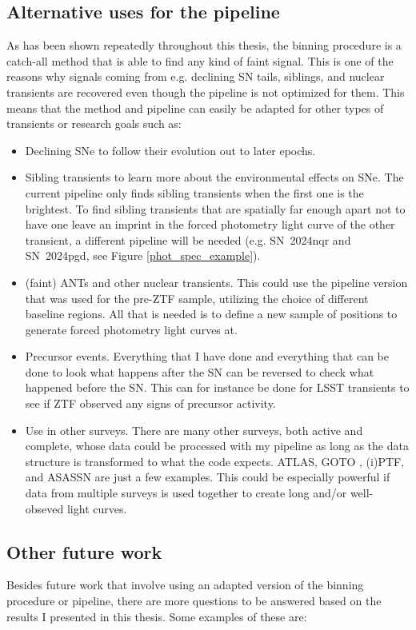 \documentclass[a4paper,oneside,12pt, class=Latex/Classes/PhDthesisPSnPDF, crop=false]{standalone}
\begin{document}
\subsection{Alternative uses for the pipeline}
As has been shown repeatedly throughout this thesis, the binning procedure is a catch-all method that is able to find any kind of faint signal. This is one of the reasons why signals coming from e.g. declining SN tails, siblings, and nuclear transients are recovered even though the pipeline is not optimized for them. This means that the method and pipeline can easily be adapted for other types of transients or research goals such as:

\begin{itemize}
	\item Declining SNe to follow their evolution out to later epochs.
	\item Sibling transients to learn more about the environmental effects on SNe. The current pipeline only finds sibling transients when the first one is the brightest. To find sibling transients that are spatially far enough apart not to have one leave an imprint in the forced photometry light curve of the other transient, a different pipeline will be needed (e.g. SN~2024nqr and SN~2024pgd, see Figure \ref{phot_spec_example}).
	\item (faint) ANTs and other nuclear transients. This could use the pipeline version that was used for the pre-ZTF sample, utilizing the choice of different baseline regions. All that is needed is to define a new sample of positions to generate forced photometry light curves at.
	\item Precursor events. Everything that I have done and everything that can be done to look what happens after the SN can be reversed to check what happened before the SN. This can for instance be done for LSST transients to see if ZTF observed any signs of precursor activity.
	\item Use in other surveys. There are many other surveys, both active and complete, whose data could be processed with my pipeline as long as the data structure is transformed to what the code expects. ATLAS, GOTO \citep[Gravitational-wave Optical Transient Observer,][]{GOTO_prototype, GOTO}, (i)PTF, and ASASSN are just a few examples. This could be especially powerful if data from multiple surveys is used together to create long and/or well-obseved light curves.
\end{itemize}


\subsection{Other future work}
Besides future work that involve using an adapted version of the binning procedure or pipeline, there are more questions to be answered based on the results I presented in this thesis. Some examples of these are:
\end{document}
